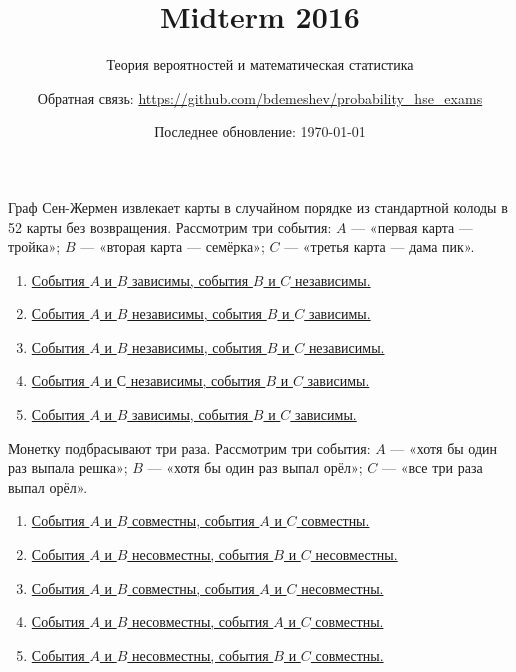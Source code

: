 \documentclass[t]{beamer}
\title{Midterm 2016}
\subtitle{Теория вероятностей и математическая статистика}
\author{Обратная связь: \url{https://github.com/bdemeshev/probability_hse_exams}}
\date{Последнее обновление: \today}
\begin{document}
 

\frame[plain]{\titlepage}

 \begin{frame} \label{1} 
\begin{block}{1} 

  Граф Сен-Жермен извлекает карты в случайном порядке из стандартной колоды в 52 карты без возвращения. Рассмотрим три события: $A$ — «первая карта — тройка»; $B$ — «вторая карта — семёрка»; $C$ — «третья карта — дама пик».
  


 \end{block} 
\begin{enumerate} 
\item[] \hyperlink{1-No}{\beamergotobutton{} События $A$ и $B$ зависимы, события $B$ и $C$ независимы.}
\item[] \hyperlink{1-No}{\beamergotobutton{} События $A$ и $B$ независимы, события $B$ и $C$ зависимы.}
\item[] \hyperlink{1-No}{\beamergotobutton{} События $A$ и $B$ независимы, события $B$ и $C$ независимы.}
\item[] \hyperlink{1-No}{\beamergotobutton{} События $A$ и $С$ независимы, события $B$ и $C$ зависимы.}
\item[] \hyperlink{1-Yes}{\beamergotobutton{} События $A$ и $B$ зависимы, события $B$ и $C$ зависимы.}
\end{enumerate} 
\end{frame} 


 \begin{frame} \label{2} 
\begin{block}{2} 

Монетку подбрасывают три раза. Рассмотрим три события: $A$ — «хотя бы один раз выпала решка»; $B$ — «хотя бы один раз выпал орёл»; $C$ — «все три раза выпал орёл».
  


 \end{block} 
\begin{enumerate} 
\item[] \hyperlink{2-No}{\beamergotobutton{} События $A$ и $B$ совместны, события $A$ и $C$ совместны.}
\item[] \hyperlink{2-No}{\beamergotobutton{} События $A$ и $B$ несовместны, события $B$ и $C$ несовместны.}
\item[] \hyperlink{2-Yes}{\beamergotobutton{} События $A$ и $B$ совместны, события $A$ и $C$ несовместны.}
\item[] \hyperlink{2-No}{\beamergotobutton{} События $A$ и $B$ несовместны, события $A$ и $C$ совместны.}
\item[] \hyperlink{2-No}{\beamergotobutton{} События $A$ и $B$ несовместны, события $B$ и $C$ совместны.}
\end{enumerate} 
\end{frame} 
\end{document}
